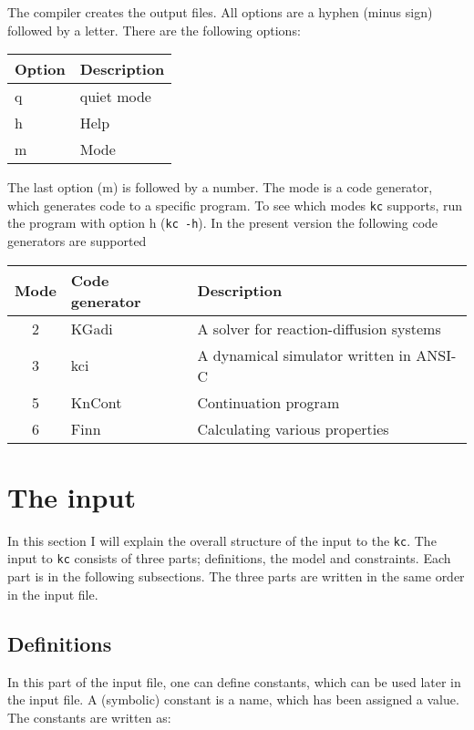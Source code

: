 The compiler creates the output files. All options are a hyphen (minus sign)
followed by a letter. There are the following options:

\begin{center}
\begin{tabular}{ll} 
\hline
Option & Description \\ \hline 
q      & quiet mode \\
h      & Help        \\  
m      & Mode        \\ \hline 
\end{tabular}
\end{center}

The last option (m) is followed by a number. The mode is a code generator,
which generates code to a specific program. To see which modes {\tt kc}
supports, run the program with option h ({\tt kc -h}). In
the present version the following code generators are supported

\begin{center}
\begin{tabular}{cll}
\hline
Mode & Code generator & Description \\ \hline
2    & KGadi          & A solver for reaction-diffusion systems \\
3    & kci            & A dynamical simulator written in ANSI-C \\
5    & KnCont         & Continuation program \\ 
6    & Finn           & Calculating various properties \\ \hline
\end{tabular}
\end{center}

\newpage
\section{The input}
In this section I will explain the overall structure of the input to 
the {\tt kc}. The input to {\tt kc} consists of three parts; 
definitions, the model and constraints.
Each part is in the following subsections. The three parts are written
in the same order in the input file.

\subsection{Definitions}
In this part of the input file, one can define constants, which can be used
later in the input file. A (symbolic) constant is a name, which has been
assigned a value. The constants are written as:

